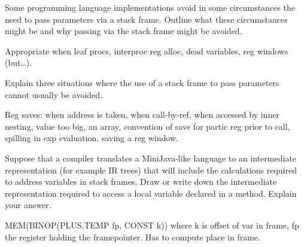 \documentclass[11pt]{bareexam}
\begin{document}
\begin{questions}
\begin{subquestions}
\subquestion

\begin{subsubquestions}
\subsubquestion
Some programming language implementations avoid in some circumstances the
need to pass parameters via a stack frame. Outline what these circumstances
might be and why passing via the stack frame might be avoided.

\begin{modelanswer}
Appropriate when leaf procs, interproc
reg alloc, dead variables, reg windows (but\ldots).
\end{modelanswer}

\subsubquestion
Explain three situations where the use of a 
stack frame to pass parameters cannot usually be avoided.
\end{subsubquestions}
\begin{modelanswer}
Reg saves: when address is taken,
when call-by-ref,
when accessed by inner nesting,
value too big,
an array,
convention of save for partic reg prior to call,
spilling in exp evaluation,
saving a reg window.
\end{modelanswer}



\subquestion
Suppose  that a compiler translates a MiniJava-like language
to an intermediate representation (for example IR trees) 
that will include 
the calculations required to address variables in stack frames.
Draw or write down
the intermediate representation
required to access a local variable declared in a method.
Explain your answer.

\begin{modelanswer}
MEM(BINOP(PLUS,TEMP fp, CONST k)) where k is offset of var in frame, fp the
register holding the framepointer. Has to compute place in frame.
\end{modelanswer}

\end{subquestions}

\end{questions}
\end{document}
